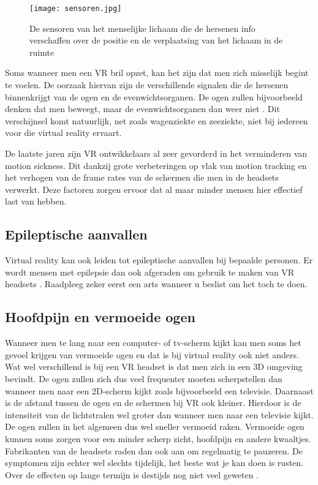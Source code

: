 \begin{figure}[h]
    \centering
    \texttt{[image: sensoren.jpg]}
    \caption{De sensoren van het menselijke lichaam die de hersenen info verschaffen over de positie en de verplaatsing van het lichaam in de ruimte \autocite{Dizzy2018}}
\end{figure}

Soms wanneer men een VR bril opzet, kan het zijn dat men zich misselijk begint te voelen. De oorzaak hiervan zijn de verschillende signalen die de hersenen binnenkrijgt van de ogen en de evenwichtsorganen.
De ogen zullen bijvoorbeeld denken dat men beweegt, maar de evenwichtsorganen dan weer niet \autocite{Kraft2017}. Dit verschijnsel komt natuurlijk, net zoals wagenziekte en zeeziekte, niet bij iedereen voor die virtual reality ervaart.

\pagebreak
De laatste jaren zijn VR ontwikkelaars al zeer gevorderd in het verminderen van motion sickness. Dit dankzij grote verbeteringen op vlak van motion tracking en het verhogen van de frame rates van de schermen die men in de headsets verwerkt. Deze factoren zorgen ervoor dat al maar minder mensen hier effectief last van hebben.

\subsection{Epileptische aanvallen}
Virtual reality kan ook leiden tot epileptische aanvallen bij bepaalde personen. Er wordt mensen met epilepsie dan ook afgeraden om gebruik te maken van VR headsets \autocite{Bolluyt2017}. Raadpleeg zeker eerst een arts wanneer u beslist om het toch te doen.

\subsection{Hoofdpijn en vermoeide ogen}
Wanneer men te lang naar een computer- of tv-scherm kijkt kan men soms het gevoel krijgen van vermoeide ogen en dat is bij virtual reality ook niet anders. Wat wel verschillend is bij een VR headset is dat men zich in een 3D omgeving bevindt. De ogen zullen zich dus veel frequenter moeten scherpstellen dan wanneer men naar een 2D-scherm kijkt zoals bijvoorbeeld een televisie. Daarnaast is de afstand tussen de ogen en de schermen bij VR ook kleiner. Hierdoor is de intensiteit van de lichtstralen wel groter dan wanneer men naar een televisie kijkt. De ogen zullen in het algemeen dus wel sneller vermoeid raken. Vermoeide ogen kunnen soms zorgen voor een minder scherp zicht, hoofdpijn en andere kwaaltjes. Fabrikanten van de headsets raden dan ook aan om regelmatig te pauzeren. De symptomen zijn echter wel slechts tijdelijk, het beste wat je kan doen is rusten. Over de effecten op lange termijn is destijds nog niet veel geweten \autocite{Bolluyt2017}.


